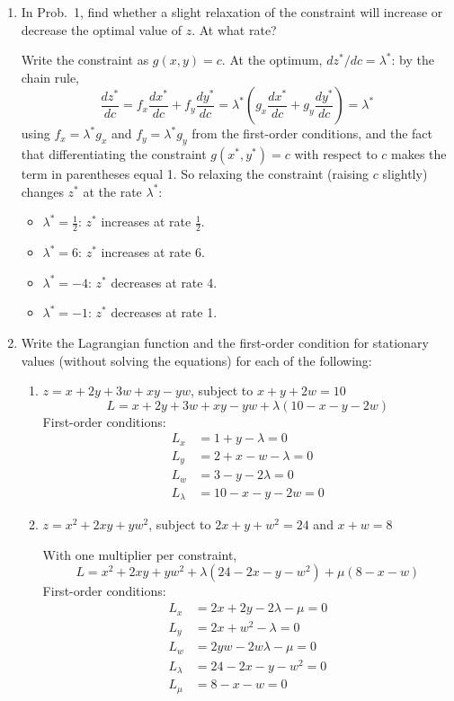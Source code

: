 \begin{enumerate}
\item[2.] In Prob.~1, find whether a slight relaxation of the constraint will increase or decrease the optimal value of $z$. At what rate?

Write the constraint as $g(x, y) = c$. At the optimum, $dz^{*}/dc = \lambda^{*}$: by the chain rule,
\[\frac{dz^{*}}{dc} = f_x \frac{dx^{*}}{dc} + f_y \frac{dy^{*}}{dc} = \lambda^{*}\left(g_x \frac{dx^{*}}{dc} + g_y \frac{dy^{*}}{dc}\right) = \lambda^{*}\]
using $f_x = \lambda^{*} g_x$ and $f_y = \lambda^{*} g_y$ from the first-order conditions, and the fact that differentiating the constraint $g(x^{*}, y^{*}) = c$ with respect to $c$ makes the term in parentheses equal 1. So relaxing the constraint (raising $c$ slightly) changes $z^{*}$ at the rate $\lambda^{*}$:
\begin{itemize}
\item[(a)] $\lambda^{*} = \tfrac{1}{2}$: $z^{*}$ increases at rate $\tfrac{1}{2}$.
\item[(b)] $\lambda^{*} = 6$: $z^{*}$ increases at rate 6.
\item[(c)] $\lambda^{*} = -4$: $z^{*}$ decreases at rate 4.
\item[(d)] $\lambda^{*} = -1$: $z^{*}$ decreases at rate 1.
\end{itemize}

\item[3.] Write the Lagrangian function and the first-order condition for stationary values (without solving the equations) for each of the following:
\begin{enumerate}
\item[(a)] $z = x + 2y + 3w + xy - yw$, subject to $x + y + 2w = 10$
\[L = x + 2y + 3w + xy - yw + \lambda(10 - x - y - 2w)\]
First-order conditions:
\begin{align*}
L_x &= 1 + y - \lambda = 0 \\
L_y &= 2 + x - w - \lambda = 0 \\
L_w &= 3 - y - 2\lambda = 0 \\
L_\lambda &= 10 - x - y - 2w = 0
\end{align*}

\item[(b)] $z = x^{2} + 2xy + yw^{2}$, subject to $2x + y + w^{2} = 24$ and $x + w = 8$

With one multiplier per constraint,
\[L = x^{2} + 2xy + yw^{2} + \lambda(24 - 2x - y - w^{2}) + \mu(8 - x - w)\]
First-order conditions:
\begin{align*}
L_x &= 2x + 2y - 2\lambda - \mu = 0 \\
L_y &= 2x + w^{2} - \lambda = 0 \\
L_w &= 2yw - 2w\lambda - \mu = 0 \\
L_\lambda &= 24 - 2x - y - w^{2} = 0 \\
L_\mu &= 8 - x - w = 0
\end{align*}
\end{enumerate}


\end{enumerate}
